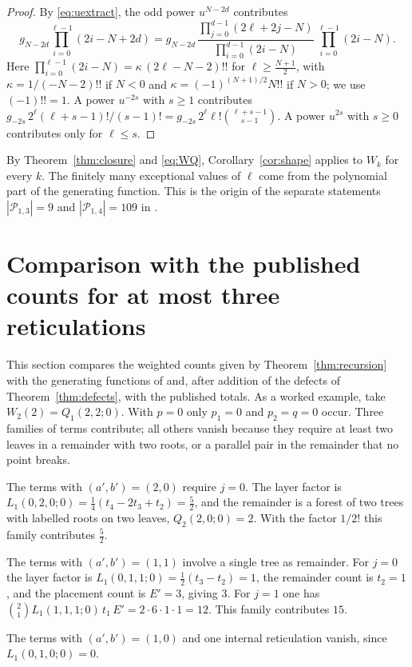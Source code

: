 \documentclass[11pt,a4paper]{article}
\theoremstyle{definition}
\newcommand{\cP}{\mathcal{P}}
\begin{document}
\begin{proof}
By \eqref{eq:uextract}, the odd power $u^{N-2d}$ contributes
\[
g_{N-2d}\prod_{i=0}^{\ell-1}(2i-N+2d)=g_{N-2d}\,\frac{\prod_{j=0}^{d-1}(2\ell+2j-N)}{\prod_{i=0}^{d-1}(2i-N)}\,\prod_{i=0}^{\ell-1}(2i-N).
\]
Here $\prod_{i=0}^{\ell-1}(2i-N)=\kappa\,(2\ell-N-2)!!$ for $\ell\ge\frac{N+1}{2}$, with $\kappa=1/(-N-2)!!$ if $N<0$ and $\kappa=(-1)^{(N+1)/2}N!!$ if $N>0$; we use $(-1)!!=1$. A power $u^{-2s}$ with $s\ge1$ contributes $g_{-2s}\,2^\ell(\ell+s-1)!/(s-1)!=g_{-2s}\,2^\ell\ell!\binom{\ell+s-1}{s-1}$. A power $u^{2s}$ with $s\ge0$ contributes only for $\ell\le s$.
\end{proof}

By Theorem~\ref{thm:closure} and \eqref{eq:WQ}, Corollary~\ref{cor:shape} applies to $W_k$ for every $k$. The finitely many exceptional values of $\ell$ come from the polynomial part of the generating function. This is the origin of the separate statements $|\cP_{1,3}|=9$ and $|\cP_{1,4}|=109$ in \cite{Yu26,YuZhang26}.


\section{Comparison with the published counts for at most three reticulations}\label{sec:verification}

This section compares the weighted counts given by Theorem~\ref{thm:recursion} with the generating functions of \cite{Mansouri22} and, after addition of the defects of Theorem~\ref{thm:defects}, with the published totals. As a worked example, take $W_2(2)=Q_1(2,2;0)$. With $p=0$ only $p_1=0$ and $p_2=q=0$ occur. Three families of terms contribute; all others vanish because they require at least two leaves in a remainder with two roots, or a parallel pair in the remainder that no point breaks.

The terms with $(a',b')=(2,0)$ require $j=0$. The layer factor is $L_1(0,2,0;0)=\tfrac14(t_4-2t_3+t_2)=\tfrac52$, and the remainder is a forest of two trees with labelled roots on two leaves, $Q_2(2,0;0)=2$. With the factor $1/2!$ this family contributes $\tfrac52$.

The terms with $(a',b')=(1,1)$ involve a single tree as remainder. For $j=0$ the layer factor is $L_1(0,1,1;0)=\tfrac12(t_3-t_2)=1$, the remainder count is $t_2=1$, and the placement count is $E'=3$, giving $3$. For $j=1$ one has $\binom21L_1(1,1,1;0)\,t_1\,E'=2\cdot6\cdot1\cdot1=12$. This family contributes $15$.

The terms with $(a',b')=(1,0)$ and one internal reticulation vanish, since $L_1(0,1,0;0)=0$.
\end{document}
